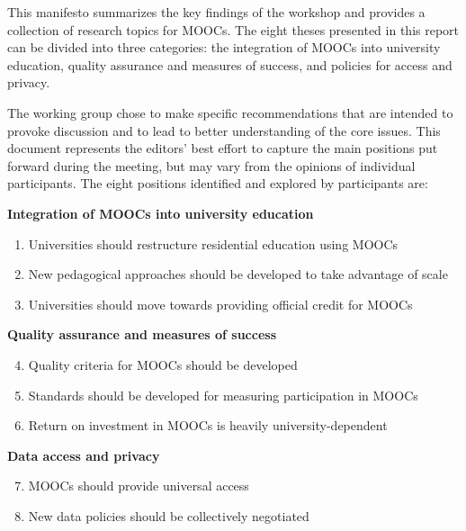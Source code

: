 
This manifesto summarizes the key findings of the workshop and provides
a collection of research topics for MOOCs. The eight theses presented in
this report can be divided into three categories: the integration of
MOOCs into university education, quality assurance and measures of
success, and policies for access and privacy.


The working group chose to make specific recommendations that are intended to provoke discussion 
and to lead to better understanding of the core issues. This document represents the
editors' best effort to capture the main positions put forward during the meeting,
but may vary from the opinions of individual participants.
The eight positions identified and explored by participants are:

\vspace{1ex}
\textbf{Integration of MOOCs into university education}

\begin{enumerate}

\item Universities should restructure residential education using
MOOCs

\item New pedagogical approaches should be developed to take
advantage of scale

\item Universities should move towards providing official
credit for MOOCs

\end{enumerate}

\textbf{Quality assurance and measures of success}

\begin{enumerate}
\setcounter{enumi}{3}

\item Quality criteria for MOOCs should be developed

\item Standards should be developed for measuring
  participation in MOOCs

\item Return on investment in MOOCs is heavily university-dependent

\end{enumerate}

\textbf{Data access and privacy}

\begin{enumerate}
\setcounter{enumi}{6}

\item MOOCs should provide universal access

\item New data
policies should be collectively negotiated

\end{enumerate}



